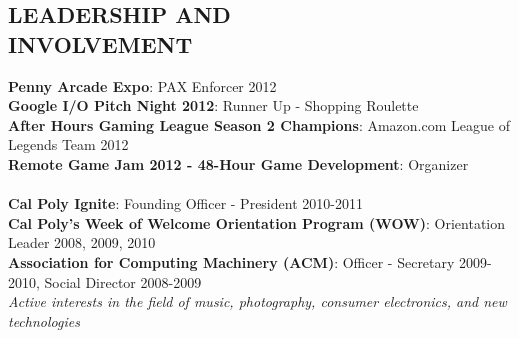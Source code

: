\documentclass[margin,line]{resume}
\begin{document}
\begin{resume}
\sectionline

    \section{\mysidestyle \textbf{\large{L}\small{EADERSHIP AND\\INVOLVEMENT}}} 
      \textbf{Penny Arcade Expo}: PAX Enforcer 2012\\
      \textbf{Google I/O Pitch Night 2012}: Runner Up - Shopping Roulette\\
      \textbf{After Hours Gaming League Season 2 Champions}: Amazon.com League of Legends Team 2012\\
      \textbf{Remote Game Jam 2012 - 48-Hour Game Development}: Organizer\\
      \\
      \textbf{Cal Poly Ignite}: Founding Officer - President 2010-2011\\
      \textbf{Cal Poly's Week of Welcome Orientation Program (WOW)}: Orientation Leader 2008, 2009, 2010\\
      \textbf{Association for Computing Machinery (ACM)}: Officer - Secretary 2009-2010, Social Director 2008-2009\\
      \textsl{Active interests in the field of music, photography, consumer electronics, and new technologies}

\end{resume}
\end{document}

